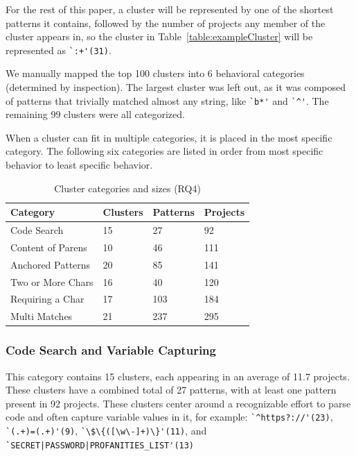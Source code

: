 For the rest of this paper, a cluster will be represented by one of the shortest patterns it contains, followed by the number of projects any member of the cluster appears in, so the cluster in Table~\ref{table:exampleCluster} will be represented as \verb!`:+'(31)!.

We manually mapped the top 100 clusters into 6 behavioral categories (determined by inspection).  The largest cluster was left out, as it was composed of patterns that trivially matched almost any string, like \verb!`b*'! and \verb!`^'!.  The remaining 99 clusters were all categorized.

When a cluster can fit in multiple categories, it is placed in the most specific category.  The following six categories are listed in order from most specific behavior to least specific behavior.

\begin{table}
\begin{center}
\begin{small}
\caption{Cluster categories and sizes (RQ4) \label{tab:clustercats}}
\begin{tabular}{llll}
\toprule
\textbf{Category} & \textbf{Clusters} & \textbf{Patterns} & \textbf{Projects} \\  \hline \bigstrut
Code Search & 15 & 27 & 92 \\ \hline \bigstrut
Content of Parens & 10 & 46 & 111\\ \hline \bigstrut
Anchored Patterns & 20 & 85 & 141\\ \hline \bigstrut
Two or More Chars & 16 & 40 & 120\\ \hline \bigstrut
Requiring a Char & 17 & 103 & 184\\ \hline \bigstrut
Multi Matches & 21 & 237 & 295\\
\bottomrule
\end{tabular}
\end{small}
\end{center}
\end{table}

\subsubsection{Code Search and Variable Capturing}
This category contains 15 clusters, each appearing in an average of 11.7 projects.  These clusters have a combined total of 27 patterns, with at least one pattern present in 92 projects. These clusters center around a recognizable effort to parse code and often capture variable values in it, for example:
\verb!`^https?://'(23)!, \verb!`(.+)=(.+)'(9)!, \verb!`\$\{([\w\-]+)\}'(11)!, and \verb!`SECRET|PASSWORD|PROFANITIES_LIST'(13)!

